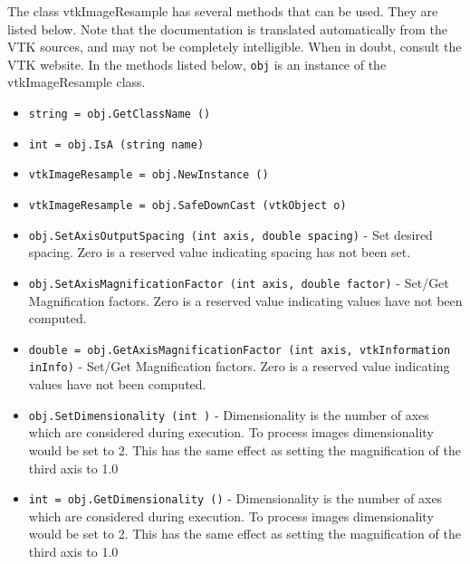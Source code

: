 The class vtkImageResample has several methods that can be used.
  They are listed below.
Note that the documentation is translated automatically from the VTK sources,
and may not be completely intelligible.  When in doubt, consult the VTK website.
In the methods listed below, \verb|obj| is an instance of the vtkImageResample class.
\begin{itemize}
\item  \verb|string = obj.GetClassName ()|

\item  \verb|int = obj.IsA (string name)|

\item  \verb|vtkImageResample = obj.NewInstance ()|

\item  \verb|vtkImageResample = obj.SafeDownCast (vtkObject o)|

\item  \verb|obj.SetAxisOutputSpacing (int axis, double spacing)| -  Set desired spacing.  
 Zero is a reserved value indicating spacing has not been set.

\item  \verb|obj.SetAxisMagnificationFactor (int axis, double factor)| -  Set/Get Magnification factors.
 Zero is a reserved value indicating values have not been computed.

\item  \verb|double = obj.GetAxisMagnificationFactor (int axis, vtkInformation inInfo)| -  Set/Get Magnification factors.
 Zero is a reserved value indicating values have not been computed.

\item  \verb|obj.SetDimensionality (int )| -  Dimensionality is the number of axes which are considered during
 execution. To process images dimensionality would be set to 2.
 This has the same effect as setting the magnification of the third
 axis to 1.0

\item  \verb|int = obj.GetDimensionality ()| -  Dimensionality is the number of axes which are considered during
 execution. To process images dimensionality would be set to 2.
 This has the same effect as setting the magnification of the third
 axis to 1.0

\end{itemize}
